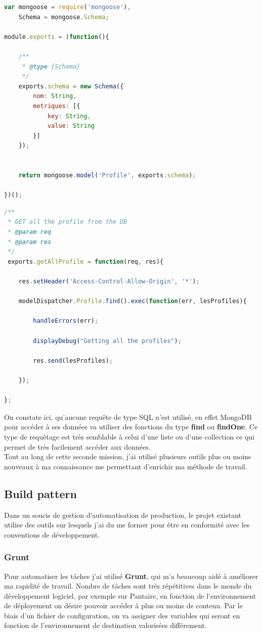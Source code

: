 \documentclass{report}
\newcommand{\jumpTwo}{\\[2\baselineskip]}
\begin{document}
\begin{lstlisting}[language=javascript, caption=Exemple de définition d'un schema NoSQL]
var mongoose = require('mongoose'),
    Schema = mongoose.Schema;

module.exports = (function(){

    /**
     * @type {Schema}
     */
    exports.schema = new Schema({
        nom: String,
        metriques: [{
            key: String,
            value: String
        }]
    });


    return mongoose.model('Profile', exports.schema);

})();
\end{lstlisting}
\begin{lstlisting}[language=javascript, caption=Exemple d'accès aux données]
/**
 * GET all the profile from the DB
 * @param req
 * @param res
 */
 exports.getAllProfile = function(req, res){

    res.setHeader('Access-Control-Allow-Origin', '*');

    modelDispatcher.Profile.find().exec(function(err, lesProfiles){

        handleErrors(err);

        displayDebug("Getting all the profiles");

        res.send(lesProfiles);

    });

};
\end{lstlisting}
On constate ici, qu'aucune requête de type SQL n'est utilisé, en effet \gls{MongoDB} pour accéder à ses données va utiliser des fonctions du type \textbf{find} ou \textbf{findOne}.
Ce type de requêtage est très semblable à celui d'une liste ou d'une collection ce qui permet de très facilement accéder aux données.
\jumpTwo
Tout au long de cette seconde mission, j'ai utilisé plusieurs outils plus ou moins nouveaux à ma connaissance me permettant d'enrichir ma méthode de travail.


\newpage



\subsection{Build pattern}   
Dans un soucis de gestion d'automatisation de production, le projet existant utilise des outils sur lesquels j'ai du me former pour être en conformité avec les conventions de développement.
\subsubsection{Grunt}
Pour automatiser les tâches j'ai utilisé \textbf{Grunt}, qui m'a beaucoup aidé à améliorer ma rapidité de travail. Nombre de tâches sont très répétitives dans le monde du développement logiciel, par exemple sur Pantaire, en fonction de l'environnement de déployement on désire pouvoir accéder à plus ou moins de contenu. Par le biais d'un fichier de configuration, on va assigner des variables qui seront en fonction de l'environnement de destination valorisées différement. 
\end{document}
